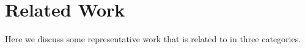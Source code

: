 \section{Related Work}



Here we discuss some representative work that is related to \name in three categories.



